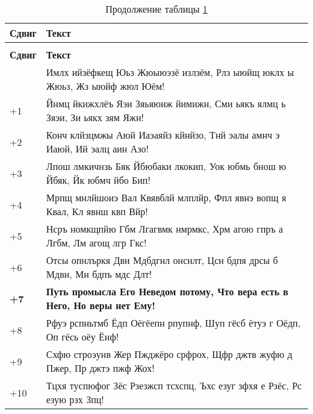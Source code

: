 \documentclass{bsuir}
\newlength{\tablewidth}
\begin{document}
	{\small
		\begin{longtable}{|>{\centering\arraybackslash}m{0.1\tablewidth}|>{\centering\arraybackslash}m{0.92\tablewidth}|}
			\caption{Зашифрованный текст со сдвигами} \label{tab:shifts}                                        \\
			\hline
			\textbf{Сдвиг} & \textbf{Текст}                                                                    \\
			\hline
			\endfirsthead
			\caption*{Продолжение таблицы \ref{tab:shifts}}                                                    \\
			\hline
			\textbf{Сдвиг} & \textbf{Текст}                                                                    \\
			\hline
			\endhead
			\hline
			\endfoot
			\hline
			\endlastfoot
			0              & Имлх ийзёфкещ Юьз Жюыюэзё излзём, Рлз ыюйщ юклх ы Жюьз, Жз ыюйф жюл Юём!          \\\hline
			+1             & Йнмц йкижхлёъ Яэи Зяьяюиж йимижн, Сми ьякъ ялмц ь Зяэи, Зи ьякх зям Яжн!          \\\hline
			+2             & Конч клйзцмжы Аюй Иаэаяйз кйнйзо, Тнй эалы амнч э Иаюй, Ий эалц аин Азо!          \\\hline
			+3             & Лпош лмкичнзь Бяк Йбюбаки лкокип, Уок юбмь бнош ю Йбяк, Йк юбмч йбо Бип!          \\\hline
			+4             & Мрпщ мнлйшоиэ Вал Квявблй млплйр, Фпл явнэ вопщ я Квал, Кл явнш квп Вйр!          \\\hline
			+5             & Нсръ номкщпйю Гбм Лгагвмк нмрмкс, Хрм агою гпръ а Лгбм, Лм агощ лгр Гкс!          \\\hline
			+6             & Отсы опнлъркя Двн Мдбдгнл онснлт, Цсн бдпя дрсы б Мдвн, Мн бдпъ мдс Длт!          \\\hline
			\textbf{+7}    & \textbf{Путь промысла Его Неведом потому, Что вера есть в Него, Но веры нет Ему!} \\\hline
			+8             & Рфуэ рспньтмб Ёдп Оёгёепн рпупнф, Шуп гёсб ётуэ г Оёдп, Оп гёсь оёу Ёнф!          \\\hline
			+9             & Схфю строэунв Жер Пжджёро срфрох, Щфр джтв жуфю д Пжер, Пр джтэ пжф Жох!          \\\hline
			+10            & Тцхя туспюфог Зёс Рзезжсп тсхспц, Ъхс езуг зфхя е Рзёс, Рс езую рзх Зпц!          \\
		\end{longtable}
	}
\end{document}
